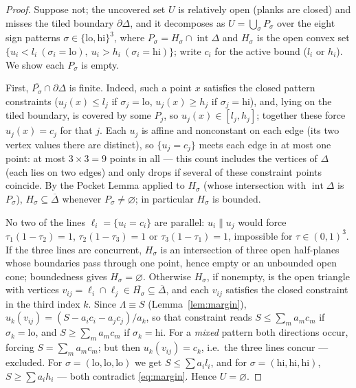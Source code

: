 \documentclass[11pt,reqno]{amsart}
\theoremstyle{plain}
\theoremstyle{definition}
\theoremstyle{remark}
\begin{document}
\begin{proof}
Suppose not; the uncovered set $U$ is
relatively open (planks are closed) and misses the tiled boundary
$\partial\Delta$, and it
decomposes as $U=\bigcup_\sigma P_\sigma$ over the eight sign patterns
$\sigma\in\{\mathrm{lo},\mathrm{hi}\}^3$, where $P_\sigma=H_\sigma\cap
\operatorname{int}\Delta$ and $H_\sigma$ is the open convex set
$\{u_i<l_i\ (\sigma_i=\mathrm{lo}),\ u_i>h_i\ (\sigma_i=\mathrm{hi})\}$; write
$c_i$ for the active bound ($l_i$ or $h_i$). We show each $P_\sigma$ is empty.

First, $\overline{P_\sigma}\cap\partial\Delta$ is finite. Indeed, such a point
$x$ satisfies the closed pattern constraints ($u_j(x)\le l_j$ if
$\sigma_j=\mathrm{lo}$, $u_j(x)\ge h_j$ if $\sigma_j=\mathrm{hi}$), and, lying
on the tiled boundary, is covered by some $P_j$, so $u_j(x)\in[l_j,h_j]$;
together these force $u_j(x)=c_j$ for that $j$. Each $u_j$ is affine and
nonconstant on each edge (its two vertex values there are distinct), so
$\{u_j=c_j\}$ meets each edge in at most one point: at most $3\times3=9$ points
in all --- this count includes the vertices of $\Delta$ (each lies on two
edges) and only drops if several of these constraint points coincide. By the
Pocket Lemma applied to $H_\sigma$ (whose intersection
with $\operatorname{int}\Delta$ is $P_\sigma$),
$H_\sigma\subseteq\overline\Delta$ whenever $P_\sigma\ne\varnothing$; in
particular $H_\sigma$ is bounded.

No two of the lines $\ell_i=\{u_i=c_i\}$ are parallel: $u_i\parallel u_j$ would
force $\tau_1(1-\tau_2)=1$, $\tau_2(1-\tau_3)=1$ or $\tau_3(1-\tau_1)=1$,
impossible for $\tau\in(0,1)^3$. If the three lines are concurrent, $H_\sigma$
is an intersection of three open half-planes whose boundaries pass through one
point, hence empty or an unbounded open cone; boundedness gives
$H_\sigma=\varnothing$. Otherwise $H_\sigma$, if nonempty, is the open triangle
with vertices $v_{ij}=\ell_i\cap\ell_j\in\overline{H_\sigma}
\subseteq\overline\Delta$, and each $v_{ij}$ satisfies the closed constraint in
the third index $k$. Since $\Lambda\equiv S$ (Lemma~\ref{lem:margin}),
$u_k(v_{ij})=(S-a_ic_i-a_jc_j)/a_k$, so that constraint reads $S\le\sum_ma_mc_m$
if $\sigma_k=\mathrm{lo}$, and $S\ge\sum_ma_mc_m$ if $\sigma_k=\mathrm{hi}$. For
a \emph{mixed} pattern both directions occur, forcing $S=\sum_ma_mc_m$; but then
$u_k(v_{ij})=c_k$, i.e.\ the three lines concur --- excluded. For
$\sigma=(\mathrm{lo},\mathrm{lo},\mathrm{lo})$ we get $S\le\sum a_il_i$, and for
$\sigma=(\mathrm{hi},\mathrm{hi},\mathrm{hi})$, $S\ge\sum a_ih_i$ --- both
contradict \eqref{eq:margin}. Hence $U=\varnothing$.
\end{proof}
\end{document}
